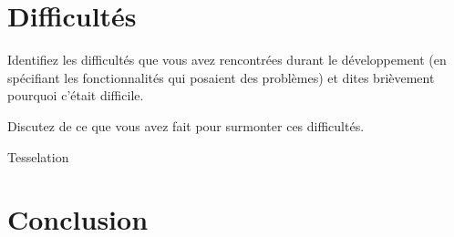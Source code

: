 \documentclass[10pt,a4paper]{article}
\begin{document}
\section{Difficultés}

\og 

    Identifiez les difficultés que vous avez rencontrées durant le développement (en spécifiant les fonctionnalités qui posaient des problèmes) et dites brièvement pourquoi c'était difficile.
    
    Discutez de ce que vous avez fait pour surmonter ces difficultés.

\fg

Tesselation

\section{Conclusion}
\end{document}
